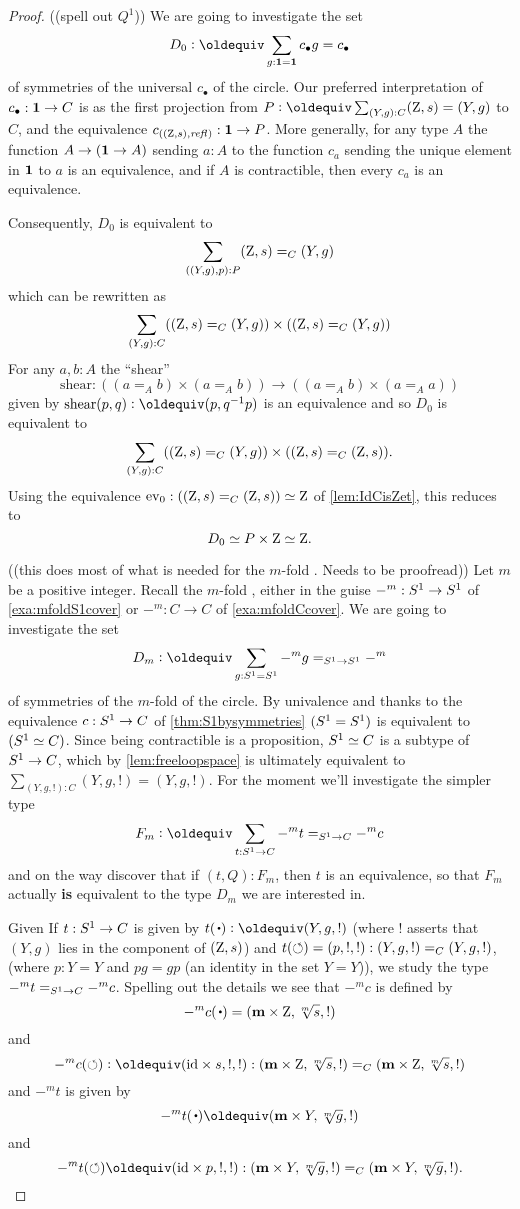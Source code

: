   \begin{proof}
  ((spell out $Q^1$))
We are going to investigate the set 
$$D_0\defequi\sum_{g:\bn 1=\bn 1}c_\bullet g=c_\bullet$$ 
of symmetries of the universal \covering $c_\bullet$ of the circle.  
Our preferred interpretation of $c_\bullet:\mathbf{1}\to C$ is as the first projection from $P\defequi\sum_{(Y,g):C}(\zet,s)=(Y,g)$ to $C$, and the equivalence $c_{((\mathrm{Z},s),\mathop{{\it refl}_{}})}:\mathbf{1}\to P$. 
More generally, for any type $A$ the function $A\to(\mathbf{1}\to A)$ sending $a:A$ to the function $c_a$ sending the unique element in $\mathbf{1}$ to $a$ is an equivalence, and if $A$ is contractible, then every $c_a$ is an equivalence.

   Consequently, $D_0$ is equivalent to
$$\sum_{((Y,g),p):P}(\mathrm{Z},s)=_C(Y,g)$$ 
which can be rewritten as
$$\sum_{(Y,g):C}((\mathrm{Z},s)=_C(Y,g))\times((\mathrm{Z},s)=_C(Y,g))
$$
For any $a,b:A$ the ``shear'' 
$$\mathrm{shear}:((a=_Ab)\times(a=_Ab))\to((a=_Ab)\times(a=_Aa))$$ 
given by $\mathrm{shear}(p,q)\defequi(p,q^{-1}p)$
is an equivalence and so $D_0$ is equivalent to 
$$\sum_{(Y,g):C}((\mathrm{Z},s)=_C(Y,g))\times ((\mathrm{Z},s)=_C(\mathrm{Z},s)).
$$
Using the equivalence $\mathrm{ev}_0:((\mathrm{Z},s)=_C(\mathrm{Z},s))\simeq\mathrm{Z}$ of \cref{lem:IdCisZet}, this
 reduces to 
$$D_0\simeq P\times\mathrm{Z}\simeq\mathrm{Z}.$$
    
((this does most of what is needed for the $m$-fold \covering.  Needs to be proofread))
    Let $m$ be a positive integer.  
Recall the $m$-fold \covering, either in the guise $-^m:{S^1}\to {S^1}$ of \cref{exa:mfoldS1cover} or $-^m:C\to C$ of \cref{exa:mfoldCcover}.
We are going to investigate the set
$$D_m\defequi\sum_{g:\Sc=\Sc}-^mg=_{\Sc\to \Sc}-^m$$  
of symmetries of the $m$-fold \covering of the circle.  
By univalence and thanks to the equivalence $c:{S^1}\to C$ of \cref{thm:S1bysymmetries} $({S^1}= {S^1})$ is equivalent to $({S^1}\simeq C)$.
Since being contractible is a proposition, ${S^1}\simeq C$ is a subtype of ${S^1}\to C$,
which by \cref{lem:freeloopspace} is ultimately equivalent to $\sum_{(Y,g,!):C}(Y,g,!)=(Y,g,!)$. 
For the moment we'll investigate the simpler type 
$$F_m\defequi\sum_{t:\Sc\to C}-^mt=_{\Sc\to C}-^mc$$
and on the way discover that if $(t,Q):F_m$, then $t$ is an equivalence, so that $F_m$ actually {\bf is} equivalent to the type $D_m$ we are interested in.

Given If $t:{S^1}\to C$ is given by $t(\base)\defequi (Y,g,!)$ (where $!$ asserts that $(Y,g)$ lies in the component of $(\mathrm{Z},s)$)  and $t(\circlearrowleft)=(p,!,!):(Y,g,!)=_C(Y,g,!)$, (where $p:Y=Y$ and $pg=gp$ (an identity in the set $Y=Y$)), we study the type $-^mt=_{{S^1}\to C}-^mc$.
Spelling out the details we see that $-^mc$ is defined by 
$$-^mc(\base)=(\bn m\times\zet,\sqrt[m]s,!)$$ and 
$$-^mc(\Sloop)\defequi(\id\times s,!,!):(\bn m\times\zet,\sqrt[m]s,!)=_C(\bn m\times\zet,\sqrt[m]s,!)$$   and $-^mt$ is given by $$-^mt(\base)\oldequiv(\bn m\times Y,\sqrt[m]g,!)$$ and 
$$-^mt(\Sloop)\oldequiv(\id\times p,!,!):(\bn m\times Y,\sqrt[m]g,!)=_C(\bn m\times Y,\sqrt[m]g,!).$$


\end{proof}
